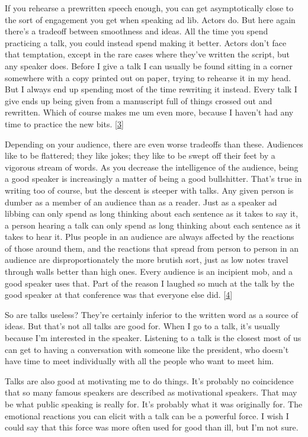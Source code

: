 If you rehearse a prewritten speech enough, you can get
asymptotically close to the sort of engagement you get when speaking
ad lib.  Actors do.  But here again there's a tradeoff between
smoothness and ideas.  All the time you spend practicing a talk,
you could instead spend making it better.  Actors don't face
that temptation, except in the rare cases where they've written the
script, but any speaker does.  Before I give a talk I can usually
be found sitting in a corner somewhere with a copy printed out on
paper, trying to rehearse it in my head.  But I always end up
spending most of the time rewriting it instead.  Every talk I give
ends up being given from a manuscript full of things crossed out
and rewritten.  Which of course makes me um even more, because I
haven't had any time to practice the new bits.
[\href{\#f3n}{3}]

Depending on your audience, there are even worse tradeoffs than
these.  Audiences like to be flattered; they like jokes; they like
to be swept off their feet by a vigorous stream of words.  As you
decrease the intelligence of the audience, being a good speaker is
increasingly a matter of being a good bullshitter.  That's true in
writing too of course, but the descent is steeper with talks.  Any
given person is dumber as a member of an audience than as a reader.
Just as a speaker ad libbing can only spend as long thinking about
each sentence as it takes to say it, a person hearing a talk can
only spend as long thinking about each sentence as it takes to hear
it.  Plus people in an audience are always affected by the reactions
of those around them, and the reactions that spread from person to
person in an audience are disproportionately the more brutish sort,
just as low notes travel through walls better than high ones.  Every
audience is an incipient mob, and a good speaker uses that.  Part
of the reason I laughed so much at the talk by the good speaker at
that conference was that everyone else did.
[\href{\#f4n}{4}]

So are talks useless?  They're certainly inferior to the written
word as a source of ideas.  But that's not all talks are good for.
When I go to a talk, it's usually because I'm interested in the
speaker.  Listening to a talk is the closest most of us can get to
having a conversation with someone like the president, who doesn't
have time to meet individually with all the people who want to meet
him.

Talks are also good at motivating me to do things.  It's probably
no coincidence that so many famous speakers are described as
motivational speakers.  That may be what public speaking is really
for.  It's probably what it was originally for.  The emotional
reactions you can elicit with a talk can be a powerful force.
I wish I could say that this force was more often used for good than
ill, but I'm not sure.







